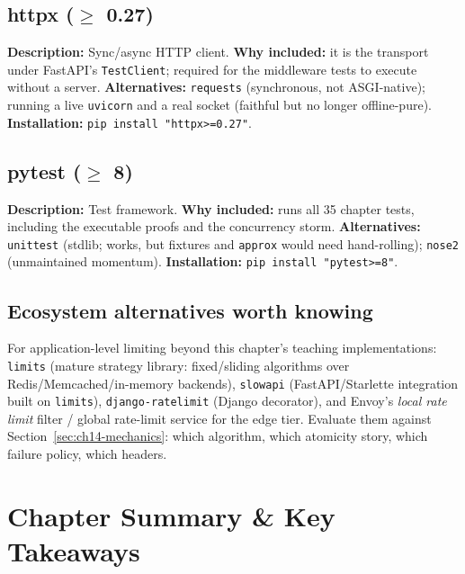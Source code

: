 \subsection{httpx ($\geq$ 0.27)}
\textbf{Description:} Sync/async HTTP client. \textbf{Why included:} it is
the transport under FastAPI's \texttt{TestClient}; required for the
middleware tests to execute without a server. \textbf{Alternatives:}
\texttt{requests} (synchronous, not ASGI-native); running a live
\texttt{uvicorn} and a real socket (faithful but no longer offline-pure).
\textbf{Installation:} \texttt{pip install "httpx>=0.27"}.

\subsection{pytest ($\geq$ 8)}
\textbf{Description:} Test framework. \textbf{Why included:} runs all 35
chapter tests, including the executable proofs and the concurrency storm.
\textbf{Alternatives:} \texttt{unittest} (stdlib; works, but fixtures and
\texttt{approx} would need hand-rolling); \texttt{nose2} (unmaintained
momentum). \textbf{Installation:} \texttt{pip install "pytest>=8"}.

\subsection*{Ecosystem alternatives worth knowing}
For application-level limiting beyond this chapter's teaching
implementations: \texttt{limits} (mature strategy library: fixed/sliding
algorithms over Redis/Memcached/in-memory backends), \texttt{slowapi}
(FastAPI/Starlette integration built on \texttt{limits}),
\texttt{django-ratelimit} (Django decorator), and Envoy's
\emph{local rate limit} filter / global rate-limit service for the edge
tier. Evaluate them against Section~\ref{sec:ch14-mechanics}: which
algorithm, which atomicity story, which failure policy, which headers.

\section{Chapter Summary \& Key Takeaways}
\label{sec:ch14-summary}

